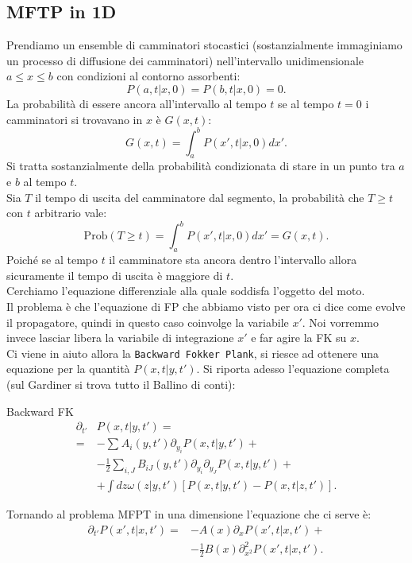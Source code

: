 \subsection{MFTP in 1D}%
\label{sub:MFTP in 1D}
Prendiamo un ensemble di camminatori stocastici (sostanzialmente immaginiamo un processo di diffusione dei camminatori) nell'intervallo unidimensionale $a\le x \le b$ con condizioni al contorno assorbenti:
\[
    P\left(a,t|x,0\right) = P\left(b,t|x,0\right)=0 
.\] 
La probabilità di essere ancora all'intervallo al tempo $t$ se al tempo $t=0$ i camminatori si trovavano in $x$ è $G(x,t)$:
\[
    G(x,t) = \int_{a}^{b} P(x',t|x, 0) dx' 
.\] 
Si tratta sostanzialmente della probabilità condizionata di stare in un punto tra $a$ e $b$ al tempo $t$.\\
Sia $T$ il tempo di uscita del camminatore dal segmento, la probabilità che $T\ge t$ con $t$ arbitrario vale:
\[
    \text{Prob}(T\ge t) = \int_{a}^{b} P\left(x',t|x,0\right)dx' = G(x,t)  
.\] 
Poiché se al tempo $t$  il camminatore sta ancora dentro l'intervallo allora sicuramente il tempo di uscita è maggiore di $t$.\\
Cerchiamo l'equazione differenziale alla quale soddisfa l'oggetto del moto. \\
Il problema è che l'equazione di FP che abbiamo visto per ora ci dice come evolve il propagatore, quindi in questo caso coinvolge la variabile $x'$. 
Noi vorremmo invece lasciar libera la variabile di integrazione $x'$ e far agire la FK su $x$. \\
Ci viene in aiuto allora la \texttt{Backward Fokker Plank}, si riesce ad ottenere una equazione per la quantità $P\left(x,t|y,t'\right)$. Si riporta adesso l'equazione completa (sul Gardiner si trova tutto il Ballino di conti):
\begin{redbox}{Backward FK}
\[\begin{aligned}
     \partial_{t'}&P\left(x,t|y,t'\right) = \\
    = & - \sum_{}^{} A_i(y,t') \partial_{y_i}P\left(x,t|y,t'\right) +\\
      & - \frac{1}{2}\sum_{i,J}^{} B_{iJ}(y,t') \partial_{y_i}\partial_{y_J}P\left(x,t|y,t'\right) + \\
      & + \int dz \omega\left(z|y,t'\right)\left[P\left(x,t|y,t'\right)-P\left(x,t|z,t'\right)\right]
.\end{aligned}\]    
\end{redbox}
\noindent
Tornando al problema MFPT in una dimensione l'equazione che ci serve è:
\[\begin{aligned}
    \partial_{t'}P\left(x',t|x,t'\right) = & -A(x) \partial_{x}P\left(x',t|x,t'\right) +\\
					   &-\frac{1}{2}B(x) \partial^2_{x^2}P\left(x',t|x,t'\right)
.\end{aligned}\]

